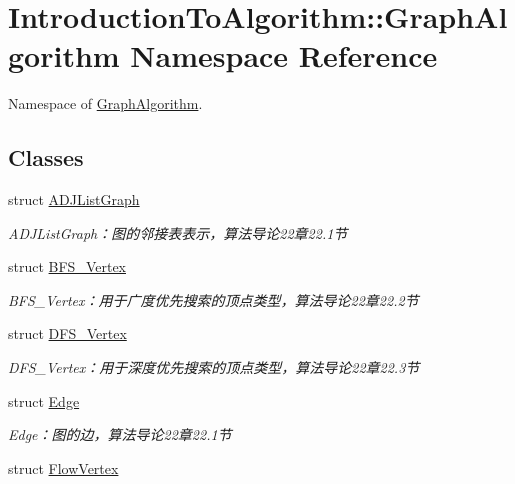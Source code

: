 \hypertarget{namespace_introduction_to_algorithm_1_1_graph_algorithm}{}\section{Introduction\+To\+Algorithm\+:\+:Graph\+Algorithm Namespace Reference}
\label{namespace_introduction_to_algorithm_1_1_graph_algorithm}


Namespace of \hyperlink{namespace_introduction_to_algorithm_1_1_graph_algorithm}{Graph\+Algorithm}.  


\subsection*{Classes}
\begin{DoxyCompactItemize}
\item 
struct \hyperlink{struct_introduction_to_algorithm_1_1_graph_algorithm_1_1_a_d_j_list_graph}{A\+D\+J\+List\+Graph}
\begin{DoxyCompactList}\small\item\em A\+D\+J\+List\+Graph：图的邻接表表示，算法导论22章22.1节 \end{DoxyCompactList}\item 
struct \hyperlink{struct_introduction_to_algorithm_1_1_graph_algorithm_1_1_b_f_s___vertex}{B\+F\+S\+\_\+\+Vertex}
\begin{DoxyCompactList}\small\item\em B\+F\+S\+\_\+\+Vertex：用于广度优先搜索的顶点类型，算法导论22章22.2节 \end{DoxyCompactList}\item 
struct \hyperlink{struct_introduction_to_algorithm_1_1_graph_algorithm_1_1_d_f_s___vertex}{D\+F\+S\+\_\+\+Vertex}
\begin{DoxyCompactList}\small\item\em D\+F\+S\+\_\+\+Vertex：用于深度优先搜索的顶点类型，算法导论22章22.3节 \end{DoxyCompactList}\item 
struct \hyperlink{struct_introduction_to_algorithm_1_1_graph_algorithm_1_1_edge}{Edge}
\begin{DoxyCompactList}\small\item\em Edge：图的边，算法导论22章22.1节 \end{DoxyCompactList}\item 
struct \hyperlink{struct_introduction_to_algorithm_1_1_graph_algorithm_1_1_flow_vertex}{Flow\+Vertex}

\end{DoxyCompactItemize}

